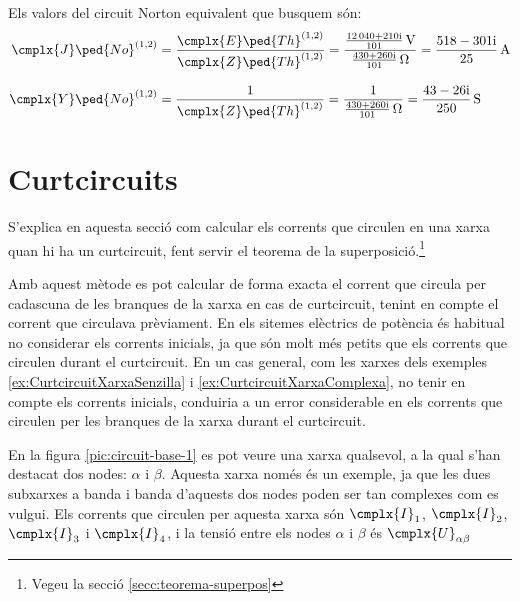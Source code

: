 \begin{exemple}
    Els valors del circuit Norton equivalent que busquem són:
    \begin{align*}
       \cmplx{J}\ped{No}^{(1,2)} &= \frac{\cmplx{E}\ped{Th}^{(1,2)}}{\cmplx{Z}\ped{Th}^{(1,2)}} =
       \frac{\frac{\complexnum{12040+j210}}{101}\,\unit{V}}{\frac{\complexnum{430+j260}}{101}\,\unit{\ohm}} =
       \frac{\complexnum{518-j301}}{25}\,\unit{A} \\[2ex]
       \cmplx{Y}\ped{No}^{(1,2)} &= \frac{1}{\cmplx{Z}\ped{Th}^{(1,2)}} =
       \frac{1}{\frac{\complexnum{430+j260}}{101}\,\unit{\ohm}} = \frac{\complexnum{43-j26}}{250}\,\unit{S}
    \end{align*}

\end{exemple}


\section{Curtcircuits}\label{sec:xarxes-curtcircuits}

S'explica en aquesta secció  com calcular els corrents que circulen en una xarxa quan hi ha un curtcircuit, fent servir el teorema de la superposició.\footnote{Vegeu la secció \ref{secc:teorema-superpos}}

Amb aquest mètode es pot calcular de forma exacta el corrent que circula per cadascuna de les branques de la xarxa en cas de curtcircuit, tenint en compte el corrent que circulava prèviament. En els sitemes elèctrics de potència és habitual no considerar els corrents inicials, ja que són molt més petits que els corrents que circulen durant el curtcircuit. En un cas general, com les xarxes dels exemples \vref{ex:CurtcircuitXarxaSenzilla} i \vref{ex:CurtcircuitXarxaComplexa}, no tenir en compte els corrents inicials, conduiria a un error considerable en els corrents que circulen per les branques de la xarxa durant el curtcircuit.

En la figura \vref{pic:circuit-base-1} es pot veure una xarxa qualsevol, a la qual s'han destacat dos nodes: $\alpha$ i $\beta$. Aquesta xarxa només és un exemple, ja que les dues subxarxes a banda i banda d'aquests dos nodes poden ser tan complexes com es vulgui. Els corrents que circulen per aquesta xarxa són $\cmplx{I}_1$, $\cmplx{I}_2$, $\cmplx{I}_3$ i $\cmplx{I}_4$, i la tensió entre els nodes $\alpha$ i $\beta$ és $\cmplx{U}_{\alpha\beta}$

\begin{center}
	
	\label{pic:circuit-base-1}
\end{center}

